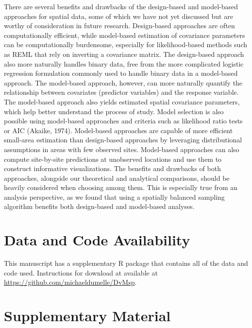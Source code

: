 \documentclass[]{elsarticle} %
\begin{document}
There are several benefits and drawbacks of the design-based and
model-based approaches for spatial data, some of which we have not yet
discussed but are worthy of consideration in future research.
Design-based approaches are often computationally efficient, while
model-based estimation of covariance parameters can be computationally
burdensome, especially for likelihood-based methods such as REML that
rely on inverting a covariance matrix. The design-based approach also
more naturally handles binary data, free from the more complicated
logistic regression formulation commonly used to handle binary data in a
model-based approach. The model-based approach, however, can more
naturally quantify the relationship between covariates (predictor
variables) and the response variable. The model-based approach also
yields estimated spatial covariance parameters, which help better
understand the process of study. Model selection is also possible using
model-based approaches and criteria such as likelihood ratio tests or
AIC (Akaike, 1974). Model-based approaches are capable of more efficient
small-area estimation than design-based approaches by leveraging
distributional assumptions in areas with few observed sites. Model-based
approaches can also compute site-by-site predictions at unobserved
locations and use them to construct informative visualizations. The
benefits and drawbacks of both approaches, alongside our theoretical and
analytical comparisons, should be heavily considered when choosing among
them. This is especially true from an analysis perspective, as we found
that using a spatially balanced sampling algorithm benefits both
design-based and model-based analyses.

\hypertarget{data-and-code-availability}{%
\section*{Data and Code Availability}\label{data-and-code-availability}}

This manuscript has a supplementary R package that contains all of the
data and code used. Instructions for download at available at
\url{https://github.com/michaeldumelle/DvMsp}.

\hypertarget{supplementary-material}{%
\section*{Supplementary Material}\label{supplementary-material}}
\end{document}
